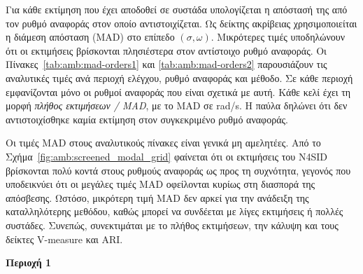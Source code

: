 Για κάθε εκτίμηση που έχει αποδοθεί σε συστάδα υπολογίζεται η απόστασή της
από τον ρυθμό αναφοράς στον οποίο αντιστοιχίζεται. Ως δείκτης ακρίβειας
χρησιμοποιείται η διάμεση απόσταση (MAD) στο επίπεδο $(\sigma,\omega)$.
Μικρότερες τιμές υποδηλώνουν ότι οι εκτιμήσεις βρίσκονται πλησιέστερα στον
αντίστοιχο ρυθμό αναφοράς. Οι Πίνακες~\ref{tab:amb:mad-orders1} και
\ref{tab:amb:mad-orders2} παρουσιάζουν τις αναλυτικές τιμές ανά περιοχή
ελέγχου, ρυθμό αναφοράς και μέθοδο. Σε κάθε περιοχή εμφανίζονται μόνο οι
ρυθμοί αναφοράς που είναι σχετικά με αυτή. Κάθε κελί έχει τη μορφή
\textit{πλήθος εκτιμήσεων / MAD}, με το MAD σε rad/s. Η παύλα δηλώνει
ότι δεν αντιστοιχίσθηκε καμία εκτίμηση στον συγκεκριμένο ρυθμό αναφοράς.

Οι τιμές MAD στους αναλυτικούς πίνακες είναι γενικά μη αμελητέες. Από το Σχήμα~\ref{fig:amb:screened_modal_grid} φαίνεται ότι οι εκτιμήσεις του N4SID βρίσκονται πολύ κοντά στους ρυθμούς αναφοράς ως προς τη συχνότητα, γεγονός που υποδεικνύει ότι οι μεγάλες τιμές MAD οφείλονται κυρίως στη διασπορά της απόσβεσης. Ωστόσο, μικρότερη τιμή MAD δεν αρκεί για την ανάδειξη της καταλληλότερης μεθόδου, καθώς μπορεί να συνδέεται με λίγες εκτιμήσεις ή πολλές συστάδες. Συνεπώς, συνεκτιμάται με το πλήθος εκτιμήσεων, την κάλυψη και τους δείκτες V-measure και ARI.

\begin{table}[H]
    \centering
    \caption{Αναλυτικές τιμές MAD ανά περιοχή ελέγχου για την πρώτη σάρωση τάξεων μοντέλου (Ομάδα τάξεων 1).}
    \label{tab:amb:mad-orders1}
    \footnotesize
    \setlength{\tabcolsep}{6.5pt}
    \renewcommand{\arraystretch}{1.08}

    \textbf{Περιοχή 1}\\[0.3em]
\end{table}

